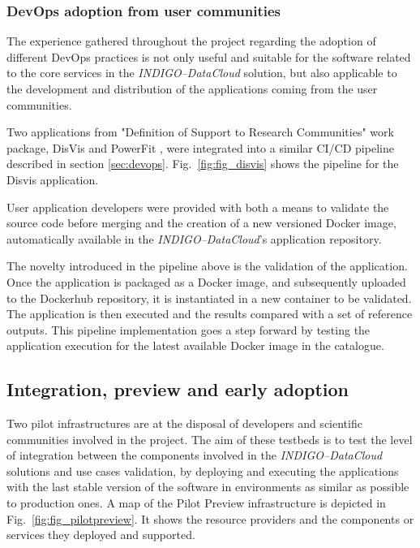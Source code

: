 \documentclass[journal]{IEEEtran}
\begin{document}
\subsubsection{DevOps adoption from user communities}

The experience gathered throughout the project regarding the adoption of
different DevOps practices is not only useful and suitable for the software related
to the core services in the {\sl INDIGO--DataCloud} solution, but also applicable to the
development and distribution of the applications coming from the user communities.

Two applications from "Definition of Support to Research Communities" work package,
DisVis \cite{disvis} and PowerFit \cite{powerfit}, were
integrated into a similar CI/CD pipeline described in section \ref{sec:devops}.
Fig.~\ref{fig:fig_disvis} shows the pipeline for the Disvis application.

User application developers were provided with both a means to validate the
source code before merging and the creation of a new versioned Docker image,
automatically available in the {\sl INDIGO--DataCloud}'s application repository.

The novelty introduced in the pipeline above is the validation of the application.
Once the application is packaged as a Docker image, and subsequently uploaded
to the Dockerhub repository, it is instantiated in a new container to be validated.
The application is then executed and the results compared with a set of reference outputs.
This pipeline implementation goes a step forward by testing the application
execution for the latest available Docker image in the catalogue.

\subsection{Integration, preview and early adoption}

Two pilot infrastructures are at the disposal of developers and scientific
communities involved in the project. The aim of these testbeds is to test the
level of integration between the components involved in the {\sl INDIGO--DataCloud}
solutions and use cases validation, by deploying and executing the applications
with the last stable version of the software in environments as similar as
possible to production ones. A map of the Pilot Preview
infrastructure is depicted in Fig.~\ref{fig:fig_pilotpreview}. It shows the
resource providers and the components or services they deployed and supported.
\end{document}
